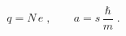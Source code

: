 \begin{equation} \label{eqp4} 
q=N \, e \;, \;\;\;\;\;\;\;  a=s \, \frac{\hbar}{m} \;. 
\end{equation} 

